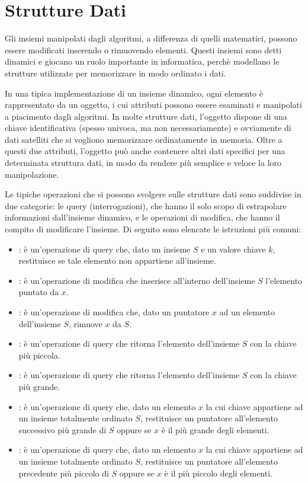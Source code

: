 \chapter{Strutture Dati}
Gli insiemi manipolati dagli algoritmi, a differenza di quelli matematici, possono essere modificati inserendo o rimuovendo elementi. Questi insiemi sono detti dinamici e giocano un ruolo importante in informatica, perchè modellano le strutture utilizzate per memorizzare in modo ordinato i dati.

In una tipica implementazione di un insieme dinamico, ogni elemento è rappresentato da un oggetto, i cui attributi possono essere esaminati e manipolati a piacimento dagli algoritmi. In molte strutture dati, l'oggetto dispone di una chiave identificativa (spesso univoca, ma non necessariamente) e ovviamente di dati satelliti che si vogliono memorizzare ordinatamente in memoria. Oltre a questi due attributi, l'oggetto può anche contenere altri dati specifici per una determinata struttura dati, in modo da rendere più semplice e veloce la loro manipolazione.

Le tipiche operazioni che si possono svolgere sulle strutture dati sono suddivise in due categorie: le query (interrogazioni), che hanno il solo scopo di estrapolare informazioni dall'insieme dinamico, e le operazioni di modifica, che hanno il compito di modificare l'insieme. Di seguito sono elencate le istruzioni più comuni:

\begin{itemize}
  \item {}: è un'operazione di query che, dato un insieme \(S\) e un valore chiave \(k\), restituisce  se tale elemento non appartiene all'insieme.
  \item {}: è un'operazione di modifica che inserisce all'interno dell'insieme \(S\) l'elemento puntato da \(x\).
  \item {}: è un'operazione di modifica che, dato un puntatore \(x\) ad un elemento dell'insieme \(S\), rimuove \(x\) da \(S\).
  \item {}: è un'operazione di query che ritorna l'elemento dell'insieme \(S\) con la chiave più piccola.
  \item {}: è un'operazione di query che ritorna l'elemento dell'insieme \(S\) con la chiave più grande.
  \item {}: è un'operazione di query che, dato un elemento \(x\) la cui chiave appartiene ad un insieme totalmente ordinato \(S\), restituisce un puntatore all'elemento successivo più grande di \(S\) oppure  se \(x\) è il più grande degli elementi.
  \item {}: è un'operazione di query che, dato un elemento \(x\) la cui chiave appartiene ad un insieme totalmente ordinato \(S\), restituisce un puntatore all'elemento precedente più piccolo di \(S\) oppure  se \(x\) è il più piccolo degli elementi.
\end{itemize}

